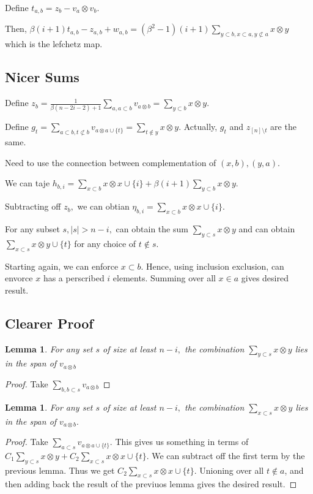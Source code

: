 \documentclass{amsart}
\newtheorem{lem}[subsubsection]{Lemma}
\begin{document}
Define $t_{a,b} = z_b - v_a\otimes v_b.$

Then, $\beta(i+1)t_{a,b} - z_{a,b} + w_{a,b} = (\beta^2 - 1)(i+1)\sum_{y\subset b,x\subset a,y\not\subset a}^{}x\otimes y$ which is the lefchetz map.

\subsection{Nicer Sums}

Define $z_b =\frac{1}{\beta(n-2i-2)+1} \sum_{a,a\subset b}^{}v_{a\otimes b}= \sum_{y\subset b}^{}x\otimes y.$

Define $g_t = \sum_{a\subset b,t\not\subset b}^{}v_{a \otimes a \cup \{t\}}= \sum_{t \notin y}^{}x\otimes y.$
Actually, $g_t$ and $z_{[n]\setminus t}$ are the same.

Need to use the connection between complementation of $(x,b),(y,a).$

We can taje $h_{b,i} = \sum_{x\subset b}^{}x \otimes x \cup \{i\} + \beta(i+1)\sum_{y \subset b}^{}x\otimes y.$

Subtracting off $z_b,$ we can obtian
$\eta_{b,i} = \sum_{x\subset b}^{}x \otimes x \cup \{i\}.$

For any subset $s,|s|>n-i,$ can obtain the sum $\sum_{y \subset s}^{}x\otimes y$ and can obtain $\sum_{x\subset s}^{}x\otimes y \cup \{t\}$ for any choice of $t \notin s.$

Starting again, we can enforce $x \subset b.$ Hence, using inclusion exclusion, can envorce $x$ has a perscribed $i$ elements. Summing over all $x \in a$ gives desired result.

\subsection{Clearer Proof}

\begin{lem}
For any set $s$ of size at least $n-i,$ the combination $\sum_{y \subset s}^{}x\otimes y$ lies in the span of $v_{a\otimes b}$
\end{lem}
\begin{proof}
Take $\sum_{b,b\subset s}^{}v_{a\otimes b}$
\end{proof}

\begin{lem}
For any set $s$ of size at least $n-i,$ the combination $\sum_{x \subset s}^{}x\otimes y$ lies in the span of $v_{a\otimes b}.$
\end{lem}
\begin{proof}
Take $\sum_{a \subset s}^{}v_{a\otimes a \cup \{t\}}.$ This gives us something in terms of $C_1\sum_{y\subset s}^{}x\otimes y + C_2\sum_{x\subset s}^{} x\otimes x\cup \{t\}.$ We can subtract off the first term by the previous lemma. Thus we get $C_2\sum_{x\subset s}^{} x\otimes x\cup \{t\}.$ Unioning over all $t \notin a$, and then adding back the result of the previuos lemma gives the desired result.
\end{proof}
\end{document}
